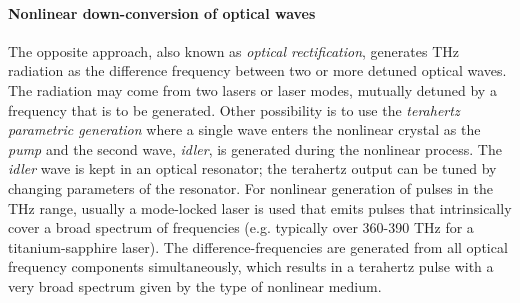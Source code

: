 \paragraph{Nonlinear down-conversion of optical waves}%
The opposite approach, also known as \textit{optical rectification}, generates THz radiation as the difference frequency between two or more detuned optical waves.
The radiation may come from two lasers or laser modes, %
mutually detuned by a frequency that is to be generated. %
Other possibility is to use the \textit{terahertz parametric generation} where a single wave enters the nonlinear crystal as the \textit{pump} and the second wave, \textit{idler}, is generated during the nonlinear process. The \textit{idler} wave is kept in an optical resonator; the terahertz output can be tuned by changing parameters of the resonator. 
For nonlinear generation of pulses in the THz range, usually a mode-locked laser is used that emits pulses that intrinsically cover a broad spectrum of frequencies (e.g. typically over 360-390 THz for a titanium-sapphire laser). The difference-frequencies are generated from all optical frequency components simultaneously, which results in a terahertz pulse with a very broad spectrum given by the type of nonlinear medium. 

